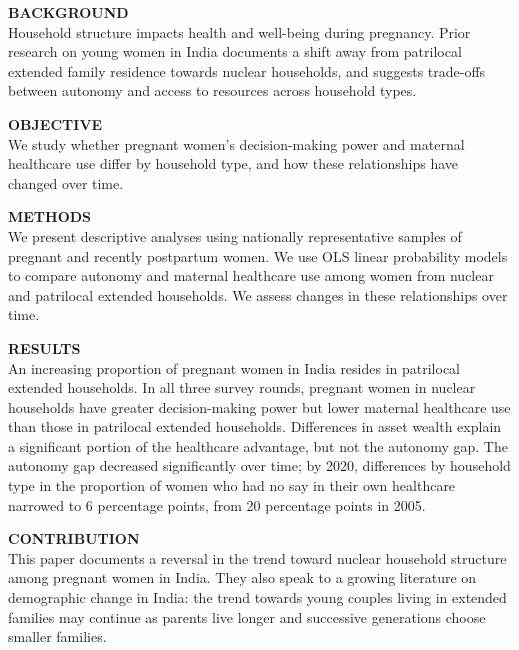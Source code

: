 \documentclass[10pt,twoside,reqno]{article}
\begin{document}
\noindent\textbf{BACKGROUND}\\
Household structure impacts health and well-being during pregnancy. Prior research on young women in India documents a shift away from patrilocal extended family residence towards nuclear households, and suggests trade-offs between autonomy and access to resources across household types.
\par
\noindent\textbf{OBJECTIVE}\\
We study whether pregnant women's decision-making power and maternal healthcare use differ by household type, and how these relationships have changed over time.
\par
\noindent\textbf{METHODS}\\
We present descriptive analyses using nationally representative samples of pregnant and recently postpartum women.  We use OLS linear probability models to compare autonomy and maternal healthcare use among women from nuclear and patrilocal extended households. We assess changes in these relationships over time.
\par
\noindent\textbf{RESULTS}\\
An increasing proportion of pregnant women in India resides in patrilocal extended households. In all three survey rounds, pregnant women in nuclear households have greater decision-making power but lower maternal healthcare use than those in patrilocal extended households. Differences in asset wealth explain a significant portion of the healthcare advantage, but not the autonomy gap.  The autonomy gap decreased significantly over time; by 2020, differences by household type in the proportion of women who had no say in their own healthcare narrowed to 6 percentage points, from 20 percentage points in 2005.
\par
\noindent\textbf{CONTRIBUTION}\\
This paper documents a reversal in the trend toward nuclear household structure among pregnant women in India. They also speak to a growing literature on demographic change in India: the trend towards young couples living in extended families may continue as parents live longer and successive generations choose smaller families.
\par


 
\vspace*{12pt}

\setlength{\parskip}{0ex}

\pagestyle{fancy}
\setcounter{footnote}{\autorzahl}
\end{document}
